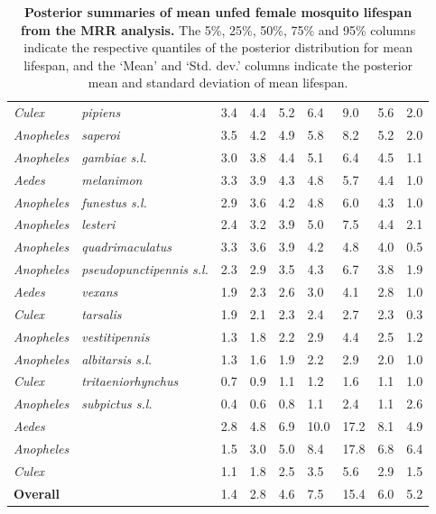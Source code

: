 \documentclass[12pt]{article}
\begin{document}
{\begin{table}[htbp]
\begin{tabular}{l|l|l|l|l|l|l|l|l}
\textit{Culex} & \textit{pipiens} & 3.4 & 4.4 & 5.2 & 6.4 & 9.0 & 5.6 & 2.0 \\
\textit{Anopheles} & \textit{saperoi} & 3.5 & 4.2 & 4.9 & 5.8 & 8.2 & 5.2 & 2.0 \\
\textit{Anopheles} & \textit{gambiae s.l.} & 3.0 & 3.8 & 4.4 & 5.1 & 6.4 & 4.5 & 1.1 \\
\textit{Aedes} & \textit{melanimon} & 3.3 & 3.9 & 4.3 & 4.8 & 5.7 & 4.4 & 1.0 \\
\textit{Anopheles} & \textit{funestus s.l.} & 2.9 & 3.6 & 4.2 & 4.8 & 6.0 & 4.3 & 1.0 \\
\textit{Anopheles} & \textit{lesteri} & 2.4 & 3.2 & 3.9 & 5.0 & 7.5 & 4.4 & 2.1 \\
\textit{Anopheles} & \textit{quadrimaculatus} & 3.3 & 3.6 & 3.9 & 4.2 & 4.8 & 4.0 & 0.5 \\
\textit{Anopheles} & \textit{pseudopunctipennis s.l.} & 2.3 & 2.9 & 3.5 & 4.3 & 6.7 & 3.8 & 1.9 \\
\textit{Aedes} & \textit{vexans} & 1.9 & 2.3 & 2.6 & 3.0 & 4.1 & 2.8 & 1.0 \\
\textit{Culex} & \textit{tarsalis} & 1.9 & 2.1 & 2.3 & 2.4 & 2.7 & 2.3 & 0.3 \\
\textit{Anopheles} & \textit{vestitipennis} & 1.3 & 1.8 & 2.2 & 2.9 & 4.4 & 2.5 & 1.2 \\
\textit{Anopheles} & \textit{albitarsis s.l.} & 1.3 & 1.6 & 1.9 & 2.2 & 2.9 & 2.0 & 1.0 \\
\textit{Culex} & \textit{tritaeniorhynchus} & 0.7 & 0.9 & 1.1 & 1.2 & 1.6 & 1.1 & 1.0 \\
\textit{Anopheles} & \textit{subpictus s.l.} & 0.4 & 0.6 & 0.8 & 1.1 & 2.4 & 1.1 & 2.6 \\
\hline
\textit{Aedes} & \text{} & 2.8 & 4.8 & 6.9 & 10.0 & 17.2 & 8.1 & 4.9 \\
\textit{Anopheles} & \text{} & 1.5 & 3.0 & 5.0 & 8.4 & 17.8 & 6.8 & 6.4 \\
\textit{Culex} & \text{} & 1.1 & 1.8 & 2.5 & 3.5 & 5.6 & 2.9 & 1.5 \\
\hline
\textbf{Overall} & \text{} & 1.4 & 2.8 & 4.6 & 7.5 & 15.4 & 6.0 & 5.2 \\
\end{tabular}
\caption{\textbf{Posterior summaries of mean unfed female mosquito lifespan from the MRR analysis.} The 5\%, 25\%, 50\%, 75\% and 95\% columns indicate the respective quantiles of the posterior distribution for mean lifespan, and the `Mean' and `Std. dev.' columns indicate the posterior mean and standard deviation of mean lifespan.}
\label{tab:mrr_estimated_lifespans}%
\end{table}%


}
\end{document}
